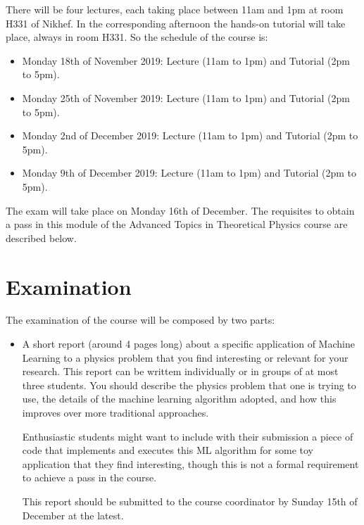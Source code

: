 \documentclass[12pt]{article}
\numberwithin{equation}{section}
\begin{document}
\begin{spacing}{1.1}
There will be four lectures, each taking place between 11am and 1pm
at room H331 of Nikhef. In the corresponding afternoon the hands-on tutorial
will take place, always in room H331. So the schedule of the course is:

\begin{itemize}

\item Monday 18th of November 2019: Lecture (11am to 1pm) and Tutorial (2pm to 5pm).

\item Monday 25th of November 2019: Lecture (11am to 1pm) and Tutorial (2pm to 5pm).

\item Monday 2nd of December 2019: Lecture (11am to 1pm) and Tutorial (2pm to 5pm).

\item Monday 9th of December 2019: Lecture (11am to 1pm) and Tutorial (2pm to 5pm).

\end{itemize}  

The exam will take place on Monday 16th of December.
%
The requisites to obtain a pass in this module of the Advanced Topics in Theoretical Physics
course are described below.

\section{Examination}

The examination of the course will be composed by two parts:

\begin{itemize}

\item A short report (around 4 pages long) about a specific application
  of Machine Learning to a physics problem that you find interesting
  or relevant for your research.
  This report can be writtem individually or in groups of at most three students.
  You should describe the physics problem that one is trying to use,
  the details of the machine learning algorithm adopted, and how
  this improves over more traditional approaches.

  Enthusiastic students might want to include with their submission
a piece of code that implements and executes this ML algorithm for some
toy application that they find interesting, though this is not a formal
requirement to achieve a pass in the course.

This report should be submitted to the course coordinator by Sunday 15th of
December at the latest.


\end{itemize}
\end{spacing}
\end{document}
